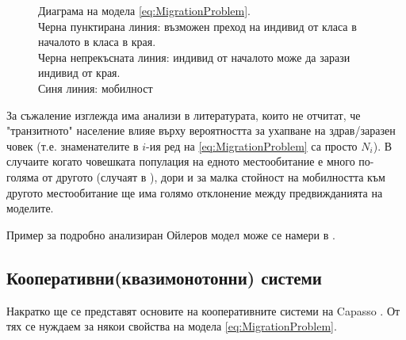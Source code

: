 \begin{figure}{}
    \centering
    \caption{Диаграма на модела \eqref{eq:MigrationProblem}.\\
    Черна пунктирана линия: възможен преход на индивид от класа в началото в класа в края.\\
    Черна непрекъсната линия: индивид от началото може да зарази индивид от края.\\
    Синя линия: мобилност}
    \label{fig:TwoPatchModel}
    \end{figure}

\begin{remark}
  За съжаление изглежда има анализи в литературата, които \cite{Cosner2009, Agusto2021} не отчитат, че "транзитното" население влияе върху вероятността за ухапване на здрав/заразен човек (т.е. знаменателите в $i$-ия ред на \eqref{eq:MigrationProblem} са просто $N_i$).
  В случаите когато човешката популация на едното местообитание е много по-голяма от другото (случаят в \cite{Agusto2021}), дори и за малка стойност на мобилността към другото местообитание ще има голямо отклонение между предвижданията на моделите.
\end{remark}

\begin{remark}
  Пример за подробно анализиран Ойлеров модел може се намери в \cite{Prosper2012}.
\end{remark}

\subsection{Кооперативни(квазимонотонни) системи}
Накратко ще се представят основите на кооперативните системи на Capasso \cite{Capasso2008}. От тях се нуждаем за някои свойства на модела \eqref{eq:MigrationProblem}.


